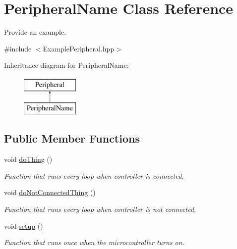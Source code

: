 \hypertarget{class_peripheral_name}{}\section{Peripheral\+Name Class Reference}
\label{class_peripheral_name}


Provide an example.  




{\ttfamily \#include $<$Example\+Peripheral.\+hpp$>$}

Inheritance diagram for Peripheral\+Name\+:\begin{figure}[H]
\begin{center}
\leavevmode
\includegraphics[height=2.000000cm]{class_peripheral_name}
\end{center}
\end{figure}
\subsection*{Public Member Functions}
\begin{DoxyCompactItemize}
\item 
void \mbox{\hyperlink{class_peripheral_name_a42388889799a14fd6cda2c2819b0e38d}{do\+Thing}} ()
\begin{DoxyCompactList}\small\item\em Function that runs every loop when controller is connected. \end{DoxyCompactList}\item 
void \mbox{\hyperlink{class_peripheral_name_a63b193d5328d4800de3bb8905f1d2f20}{do\+Not\+Connected\+Thing}} ()
\begin{DoxyCompactList}\small\item\em Function that runs every loop when controller is not connected. \end{DoxyCompactList}\item 
void \mbox{\hyperlink{class_peripheral_name_aa6b1719095b6e25d80a2567f400316db}{setup}} ()
\begin{DoxyCompactList}\small\item\em Function that runs once when the microcontroller turns on. \end{DoxyCompactList}\end{DoxyCompactItemize}


